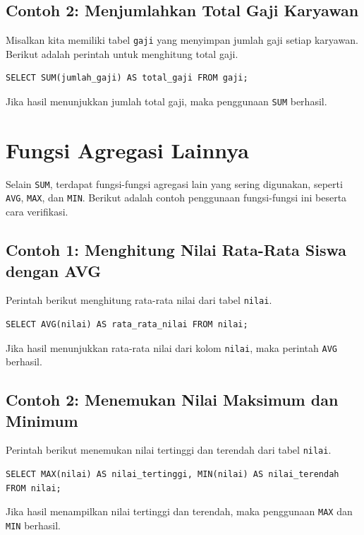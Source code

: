 \subsection*{Contoh 2: Menjumlahkan Total Gaji Karyawan}
Misalkan kita memiliki tabel \texttt{gaji} yang menyimpan jumlah gaji setiap karyawan. Berikut adalah perintah untuk menghitung total gaji.

\begin{lstlisting}[style=sql]
	SELECT SUM(jumlah_gaji) AS total_gaji FROM gaji;
\end{lstlisting}

Jika hasil menunjukkan jumlah total gaji, maka penggunaan \texttt{SUM} berhasil.

\section{Fungsi Agregasi Lainnya}

Selain \texttt{SUM}, terdapat fungsi-fungsi agregasi lain yang sering digunakan, seperti \texttt{AVG}, \texttt{MAX}, dan \texttt{MIN}. Berikut adalah contoh penggunaan fungsi-fungsi ini beserta cara verifikasi.

\subsection*{Contoh 1: Menghitung Nilai Rata-Rata Siswa dengan AVG}
Perintah berikut menghitung rata-rata nilai dari tabel \texttt{nilai}.

\begin{lstlisting}[style=sql]
	SELECT AVG(nilai) AS rata_rata_nilai FROM nilai;
\end{lstlisting}

Jika hasil menunjukkan rata-rata nilai dari kolom \texttt{nilai}, maka perintah \texttt{AVG} berhasil.

\subsection*{Contoh 2: Menemukan Nilai Maksimum dan Minimum}
Perintah berikut menemukan nilai tertinggi dan terendah dari tabel \texttt{nilai}.

\begin{lstlisting}[style=sql]
	SELECT MAX(nilai) AS nilai_tertinggi, MIN(nilai) AS nilai_terendah FROM nilai;
\end{lstlisting}

Jika hasil menampilkan nilai tertinggi dan terendah, maka penggunaan \texttt{MAX} dan \texttt{MIN} berhasil.

